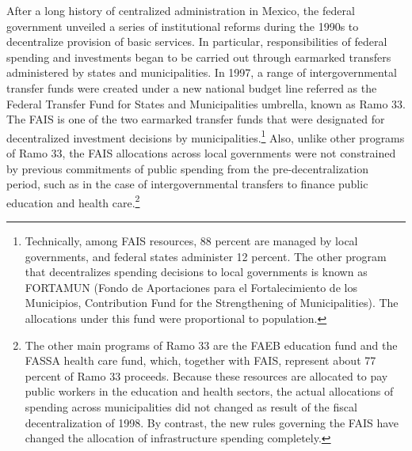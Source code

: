 \documentclass[dv_diss_main.tex]{subfiles}
\begin{document}
After a long history of centralized administration in Mexico, the federal government unveiled a series of institutional reforms during the 1990s to decentralize provision of basic services. In particular, responsibilities of federal spending and investments began to be carried out through earmarked transfers administered by states and municipalities. In 1997, a range of intergovernmental transfer funds were created under a new national budget line referred as the Federal Transfer Fund for States and Municipalities umbrella, known as Ramo 33. The FAIS is one of the two earmarked transfer funds that were designated for decentralized investment decisions by municipalities.\footnote{Technically, among FAIS resources, 88 percent are managed by local governments, and federal states administer 12 percent. The other program that decentralizes spending decisions to local governments is known as FORTAMUN (Fondo de Aportaciones para el Fortalecimiento de los Municipios, Contribution Fund for the Strengthening of Municipalities). The allocations under this fund were proportional to population.} Also, unlike other programs of Ramo 33, the FAIS allocations across local governments were not constrained by previous commitments of public spending from the pre-decentralization period, such as in the case of intergovernmental transfers to finance public education and health care.\footnote{ The other main programs of Ramo 33 are the FAEB education fund and the FASSA health care fund, which, together with FAIS, represent about 77 percent of Ramo 33 proceeds. Because these resources are allocated to pay public workers in the education and health sectors, the actual allocations of spending across municipalities did not changed as result of the fiscal decentralization of 1998. By contrast, the new rules governing the FAIS have changed the allocation of infrastructure spending completely.}
\end{document}
